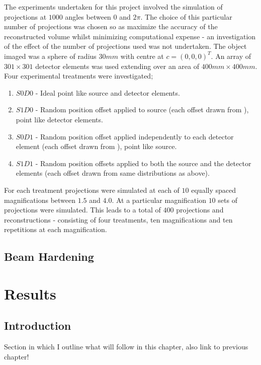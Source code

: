 \documentclass[
  twoside,
  11pt, a4paper,
  footinclude=true,
  headinclude=true,
  cleardoublepage=empty
]{scrbook}
\begin{document}
The experiments undertaken for this project involved the simulation of projections at $1000$ angles between $0$ and $2\pi$. The choice of this particular number of projections was chosen so as maximize the accuracy of the reconstructed volume whilst minimizing computational expense - an investigation of the effect of the number of projections used was not undertaken. The object imaged was a sphere of radius $30mm$ with centre at $c = (0,0,0)^T$. An array of $301\times301$ detector elements was used extending over an area of $400mm\times400mm$. Four experimental treatments were investigated;

\begin{enumerate}
\item $S0D0$ - Ideal point like source and detector elements.
\item $S1D0$ - Random position offset applied to source (each offset drawn from ), point like detector elements.
\item $S0D1$ - Random position offset applied independently to each detector element (each offset drawn from ), point like source.
\item $S1D1$ - Random position offsets applied to both the source and the detector elements (each offset drawn from same distributions as above).
\end{enumerate}

For each treatment projections were simulated at each of $10$ equally spaced magnifications between $1.5$ and $4.0$. At a particular magnification $10$ sets of projections were simulated. This leads to a total of $400$ projections and reconstructions - consisting of four treatments, ten magnifications and ten repetitions at each magnification.






\section{Beam Hardening}
\chapter{Results}

\section{Introduction}

Section in which I outline what will follow in this chapter, also link to previous chapter!
\end{document}
